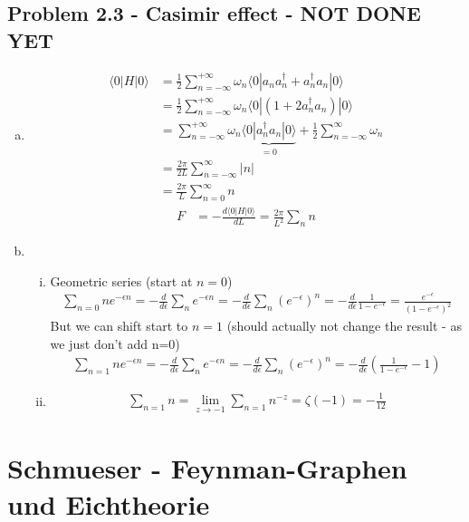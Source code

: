 \documentclass[../main.tex]{subfiles}
\begin{document}
\subsection{Problem 2.3 - Casimir effect - NOT DONE YET}
\begin{enumerate}[(a)]
\item
\begin{align}
\langle0|H|0\rangle
&=\frac{1}{2}\sum_{n=-\infty}^{+\infty}\omega_n\langle0|a_na_n^\dagger+a_n^\dagger a_n|0\rangle\\
&=\frac{1}{2}\sum_{n=-\infty}^{+\infty}\omega_n\langle0|(1+2a_n^\dagger a_n)|0\rangle\\
&=\sum_{n=-\infty}^{+\infty}\omega_n\underbrace{\langle0|a_n^\dagger a_n|0\rangle}_{=0}+\frac{1}{2}\sum_{n=-\infty}^\infty\omega_n\\
&=\frac{2\pi}{2L}\sum_{n=-\infty}^\infty|n|\\
&=\frac{2\pi}{L}\sum_{n=0}^\infty n
\end{align}
\begin{align}
F&=-\frac{d\langle0|H|0\rangle}{dL}=\frac{2\pi}{L^2}\sum_{n}n
\end{align}
\item
\begin{enumerate}[(i)]
\item Geometric series (start at $n=0$)
\begin{align}
\sum_{n=0} ne^{-\epsilon n}
=-\frac{d}{d\epsilon}\sum_ne^{-\epsilon n}
=-\frac{d}{d\epsilon}\sum_n(e^{-\epsilon})^n
=-\frac{d}{d\epsilon}\frac{1}{1-e^{-\epsilon}}
=\frac{e^{-\epsilon}}{(1-e^{-\epsilon})^2}
\end{align}
But we can shift start to $n=1$ (should actually not change the result - as we just don't add n=0)
\begin{align}
\sum_{n=1} ne^{-\epsilon n}
=-\frac{d}{d\epsilon}\sum_ne^{-\epsilon n}
=-\frac{d}{d\epsilon}\sum_n(e^{-\epsilon})^n
=-\frac{d}{d\epsilon}\left(\frac{1}{1-e^{-\epsilon}}-1\right)
\end{align}
\item
\begin{align}
\sum_{n=1}n=\lim_{z\rightarrow-1}\sum_{n=1}n^{-z}=\zeta(-1)=-\frac{1}{12}
\end{align}
\end{enumerate}
\end{enumerate}

\section{{\sc Schmueser} - Feynman-Graphen und Eichtheorie}
\end{document}
